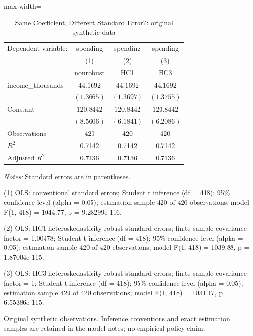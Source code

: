 \begin{table}[htbp]
\centering
\caption{Same Coefficient, Different Standard Error?: original synthetic data}
\label{tab:09-robust-uncertainty}
\begingroup
\small
\setlength{\tabcolsep}{6pt}
\renewcommand{\arraystretch}{1.12}
\begin{adjustbox}{max width=\linewidth}
\begin{tabular}{@{}lccc@{}}
\toprule
Dependent variable: & spending & spending & spending \\
 & (1) & (2) & (3) \\
 & nonrobust & HC1 & HC3 \\
\midrule
income\_thousands & $44.1692$ & $44.1692$ & $44.1692$ \\
 & $(1.3665)$ & $(1.3697)$ & $(1.3755)$ \\[0.35em]
Constant & $120.8442$ & $120.8442$ & $120.8442$ \\
 & $(8.5606)$ & $(6.1841)$ & $(6.2086)$ \\[0.35em]
\midrule
Observations & 420 & 420 & 420 \\
$R^{2}$ & 0.7142 & 0.7142 & 0.7142 \\
$\text{Adjusted }R^{2}$ & 0.7136 & 0.7136 & 0.7136 \\
\bottomrule
\end{tabular}
\end{adjustbox}
\par\smallskip
\begin{minipage}{\linewidth}
\footnotesize
\raggedright
\textit{Notes:} Standard errors are in parentheses.\par
(1) OLS: conventional standard errors; Student t inference (df = 418); 95\% confidence level (alpha = 0.05); estimation sample 420 of 420 observations; model F(1, 418) = 1044.77, p = 9.28299e-116.\par
(2) OLS: HC1 heteroskedasticity-robust standard errors; finite-sample covariance factor = 1.00478; Student t inference (df = 418); 95\% confidence level (alpha = 0.05); estimation sample 420 of 420 observations; model F(1, 418) = 1039.88, p = 1.87004e-115.\par
(3) OLS: HC3 heteroskedasticity-robust standard errors; finite-sample covariance factor = 1; Student t inference (df = 418); 95\% confidence level (alpha = 0.05); estimation sample 420 of 420 observations; model F(1, 418) = 1031.17, p = 6.55386e-115.\par
Original synthetic observations. Inference conventions and exact estimation samples are retained in the model notes; no empirical policy claim.\par
\end{minipage}
\endgroup
\end{table}
